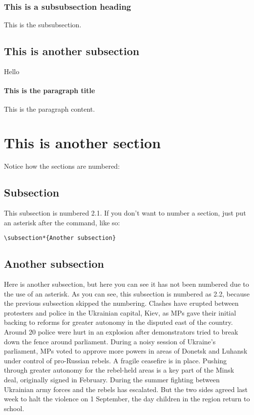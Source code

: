 \documentclass[a4paper,12pt]{article}
\begin{document}
\subsubsection{This is a subsubsection heading}
This is the subsubsection.

\subsection{This is another subsection}
Hello

\paragraph{This is the paragraph title}
This is the paragraph content.

\section{This is another section}
Notice how the sections are numbered:
\subsection{Subsection}
This subsection is numbered 2.1. If you don't want to number a section, just put an asterisk after the command, like so:

\begin{verbatim}
\subsection*{Another subsection}
\end{verbatim}

\subsection*{Another subsection}
Here is another subsection, but here you can see it has not been numbered due to the use of an asterisk.
As you can see, this subsection is numbered as 2.2, because the previous subsection skipped the numbering.  Clashes have erupted between protesters and police in the Ukrainian capital, Kiev, as MPs gave their initial backing to reforms for greater autonomy in the disputed east of the country.  Around 20 police were hurt in an explosion after demonstrators tried to break down the fence around parliament.  During a noisy session of Ukraine's parliament, MPs voted to approve more powers in areas of Donetsk and Luhansk under control of pro-Russian rebels.  A fragile ceasefire is in place.  Pushing through greater autonomy for the rebel-held areas is a key part of the Minsk deal, originally signed in February.  During the summer fighting between Ukrainian army forces and the rebels has escalated. But the two sides agreed last week to halt the violence on 1 September, the day children in the region return to school.  
\end{document}
